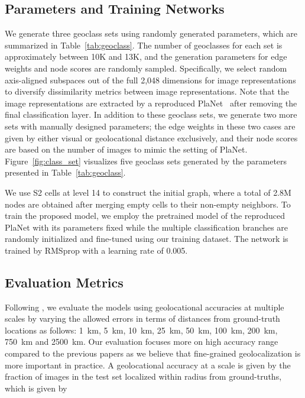 \documentclass[runningheads]{llncs}
\begin{document}
\iffalse
We introduce a new dataset called FlickrGeo, which consists of 44.8M geotagged photos from Flickr. 
FlickrGeo is split into 30.3M training images and 14.5M testing images, and contains images from all around the world. 
Minimal filtering has been applied to weed out unsuitable photos; we accept images only if they look natural based on classifier outputs (e.g., non-clipart images, non-product photos, images with natural background) and have a minimum size of 0.1 megapixels. 
Both dataset size and image distribution make this dataset challenging.
For comparability with previous work, we also evaluate on the Im2GPS test set~\cite{hays08im2gps} that consists of 237 Flickr photos manually selected to contain at least some geolocation cues.
\fi

\subsection{Parameters and Training Networks}
\label{sub:parameters}
We generate three geoclass sets using randomly generated parameters, which are summarized in Table~\ref{tab:geoclass}.
The number of geoclasses for each set is approximately between 10K and 13K, and the generation parameters for edge weights and node scores are randomly sampled.
Specifically, we select random axis-aligned subspaces out of the full 2,048 dimensions for image representations to diversify dissimilarity metrics between image representations.
Note that the image representations are extracted by a reproduced PlaNet~\cite{weyand16planet} after removing the final classification layer.
In addition to these geoclass sets, we generate two more sets with manually designed parameters; the edge weights in these two cases are given by either visual or geolocational distance exclusively, and their node scores are based on the number of images to mimic the setting of PlaNet.
Figure~\ref{fig:class_set} visualizes five geoclass sets generated by the parameters presented in Table~\ref{tab:geoclass}.

We use S2 cells at level 14 to construct the initial graph, where a total of 2.8M nodes are obtained after merging empty cells to their non-empty neighbors.
To train the proposed model, we employ the pretrained model of the reproduced PlaNet with its parameters fixed while the multiple classification branches are randomly initialized and fine-tuned using our training dataset.
The network is trained by RMSprop with a learning rate of 0.005.


\subsection{Evaluation Metrics}
Following \cite{vo17revisiting,weyand16planet}, we evaluate the models using geolocational accuracies at multiple scales by varying the allowed errors in terms of distances from ground-truth locations as follows: 1~km, 5~km, 10~km, 25~km, 50~km, 100~km, 200~km, 750~km and 2500~km.
Our evaluation focuses more on high accuracy range compared to the previous papers as we believe that fine-grained geolocalization is more important in practice.
A geolocational accuracy  at a scale is given by the fraction of images in the test set localized within radius  from ground-truths, which is given by
\end{document}
